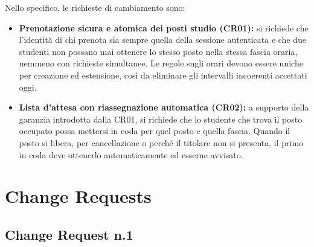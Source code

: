 \documentclass[11pt,a4paper,oneside,openany]{book}
\begin{document}
Nello specifico, le richieste di cambiamento sono:
\begin{itemize}
  \item \textbf{Prenotazione sicura e atomica dei posti studio (CR01):} si
        richiede che l'identità di chi prenota sia sempre quella della sessione
        autenticata e che due studenti non possano mai ottenere lo stesso posto
        nella stessa fascia oraria, nemmeno con richieste simultanee. Le regole
        sugli orari devono essere uniche per creazione ed estensione, così da
        eliminare gli intervalli incoerenti accettati oggi.
  \item \textbf{Lista d'attesa con riassegnazione automatica (CR02):} a
        supporto della garanzia introdotta dalla CR01, si richiede che lo
        studente che trova il posto occupato possa mettersi in coda per quel
        posto e quella fascia. Quando il posto si libera, per cancellazione o
        perché il titolare non si presenta, il primo in coda deve ottenerlo
        automaticamente ed esserne avvisato.
\end{itemize}

\chapter{Change Requests}

\section{Change Request n.1}
\end{document}
